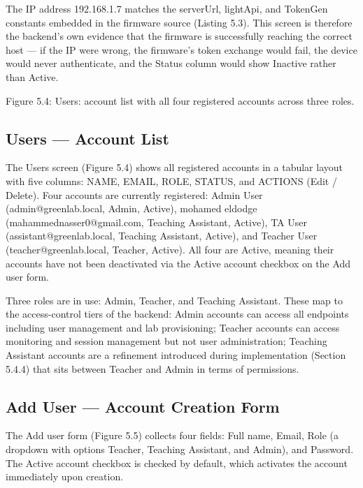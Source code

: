 The IP address 192.168.1.7 matches the serverUrl, lightApi, and TokenGen constants embedded in the ﬁrmware source (Listing 5.3). This screen is therefore the backend's
own evidence that the ﬁrmware is successfully reaching the correct host --- if the IP were
wrong, the ﬁrmware's token exchange would fail, the device would never authenticate, and
the Status column would show Inactive rather than Active.








Figure 5.4: Users: account list with all four registered accounts across three roles.



\subsection{Users --- Account List}


The Users screen (Figure 5.4) shows all registered accounts in a tabular layout with ﬁve
columns: NAME, EMAIL, ROLE, STATUS, and ACTIONS (Edit / Delete). Four accounts are currently registered: Admin User (admin@greenlab.local, Admin, Active),
mohamed eldodge (mahammednasser0@gmail.com, Teaching Assistant, Active), TA User
(assistant@greenlab.local, Teaching Assistant, Active), and Teacher User (teacher@greenlab.local,
Teacher, Active). All four are Active, meaning their accounts have not been deactivated via
the Active account checkbox on the Add user form.

Three roles are in use: Admin, Teacher, and Teaching Assistant. These map to the
access-control tiers of the backend: Admin accounts can access all endpoints including
user management and lab provisioning; Teacher accounts can access monitoring and session management but not user administration; Teaching Assistant accounts are a reﬁnement
introduced during implementation (Section 5.4.4) that sits between Teacher and Admin in
terms of permissions.



\subsection{Add User --- Account Creation Form}


The Add user form (Figure 5.5) collects four ﬁelds: Full name, Email, Role (a dropdown
with options Teacher, Teaching Assistant, and Admin), and Password. The Active account
checkbox is checked by default, which activates the account immediately upon creation.





